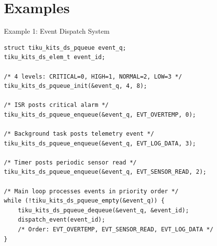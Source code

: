 \documentclass[aspectratio=169, 10pt]{beamer}
\begin{document}
\section{Examples}

\begin{frame}[fragile]{Example 1: Event Dispatch System}
\begin{lstlisting}[style=cstyle,
  title={Event dispatcher with 4 priority levels}]
struct tiku_kits_ds_pqueue event_q;
tiku_kits_ds_elem_t event_id;

/* 4 levels: CRITICAL=0, HIGH=1, NORMAL=2, LOW=3 */
tiku_kits_ds_pqueue_init(&event_q, 4, 8);

/* ISR posts critical alarm */
tiku_kits_ds_pqueue_enqueue(&event_q, EVT_OVERTEMP, 0);

/* Background task posts telemetry event */
tiku_kits_ds_pqueue_enqueue(&event_q, EVT_LOG_DATA, 3);

/* Timer posts periodic sensor read */
tiku_kits_ds_pqueue_enqueue(&event_q, EVT_SENSOR_READ, 2);

/* Main loop processes events in priority order */
while (!tiku_kits_ds_pqueue_empty(&event_q)) {
    tiku_kits_ds_pqueue_dequeue(&event_q, &event_id);
    dispatch_event(event_id);
    /* Order: EVT_OVERTEMP, EVT_SENSOR_READ, EVT_LOG_DATA */
}
\end{lstlisting}
\end{frame}
\end{document}
